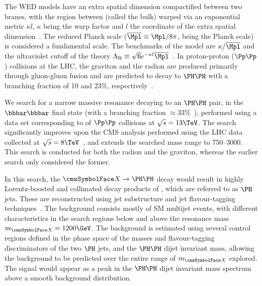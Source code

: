 The WED models have an extra spatial dimension compactified between two branes, with the region between (called the bulk) warped via an 
exponential metric ${\kappa l}$, $\kappa$ being the warp factor and $l$ the coordinate of the extra spatial dimension~\cite{Giudice:2000av}.
 The reduced Planck scale ($\overline{\Mpl} \equiv \Mpl/8\pi$, \Mpl being the Planck scale) is considered a fundamental scale.
The benchmarks of the model are $\kappa/\overline{\Mpl}$ and the ultraviolet cutoff of the theory 
$\LambdaR \equiv \sqrt{6} e^{-\kappa l} \overline{\Mpl}$~\cite{Goldberger:1999uk}.
In proton-proton ($\Pp\Pp$) collisions at the LHC, the graviton and the radion are produced primarily through gluon-gluon fusion and are 
predicted to decay to $\PH\PH$ with a branching fraction of 10 and 23\%, respectively~\cite{Oliveira:2014kla}.

We search for a narrow massive resonance decaying to an $\PH\PH$ pair, in the $\bbbar\bbbar$ final state (with a branching fraction 
$\approx$33\%~\cite{deFlorian:2016spz}), performed using a data set corresponding to \intLumi of $\Pp\Pp$ collisions at $\sqrt{s} = 13\TeV$.
The search significantly improves upon the CMS analysis performed using the LHC data collected at $\sqrt{s} = 8\TeV$~\cite{Khachatryan:2016cfa}, and extends the searched mass range to 750--3000\GeV.
This search is conducted for both the radion and the graviton, whereas the earlier search only considered the former.

In this search, the $\PX \to \PH\PH$ decay would result in highly Lorentz-boosted and collimated decay products of \Hbb, which are referred 
to as $\PH$ jets. These are reconstructed using jet substructure and jet flavour-tagging 
techniques~\cite{Butterworth:2008iy,Cooper:2013kia,Gouzevitch:2013qca}.
The background consists mostly of SM multijet events, with different characteristics in the search regions below and above the resonance 
mass $\mx = 1200\GeV$.
The background is estimated using several control regions defined in the phase space of the masses and flavour-tagging discriminators of 
the two $\PH$ jets, and the $\PH\PH$ dijet invariant mass, allowing the background to be predicted over the entire range of $\mx$ explored.
The signal would appear as a peak in the $\PH\PH$ dijet invariant mass spectrum above a smooth background distribution.


